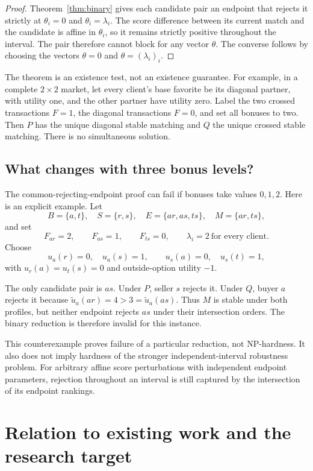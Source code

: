 \documentclass[11pt,letterpaper]{article}
\theoremstyle{definition}
\theoremstyle{remark}
\begin{document}
\begin{proof}
Theorem~\ref{thm:binary} gives each candidate pair an endpoint that rejects it
strictly at \(\theta_i=0\) and \(\theta_i=\lambda_i\).
The score difference between its current match and the candidate is affine
in \(\theta_i\), so it remains strictly positive throughout the interval.
The pair therefore cannot block for any vector \(\theta\).
The converse follows by choosing the vectors \(\theta=0\) and
\(\theta=(\lambda_i)_i\).
\end{proof}

The theorem is an existence test, not an existence guarantee. For example, in
a complete \(2\times2\) market, let every client's base favorite be its diagonal
partner, with utility one, and the other partner have utility zero. Label the
two crossed transactions \(F=1\), the diagonal transactions \(F=0\), and set
all bonuses to two. Then \(P\) has the unique diagonal stable matching and
\(Q\) the unique crossed stable matching. There is no simultaneous solution.

\subsection{What changes with three bonus levels?}

The common-rejecting-endpoint proof can fail if bonuses take values
\(0,1,2\). Here is an explicit example. Let
\[
B=\{a,t\},\quad S=\{r,s\},\quad
E=\{ar,as,ts\},\quad M=\{ar,ts\},
\]
and set
\[
F_{ar}=2,\qquad F_{as}=1,\qquad F_{ts}=0,\qquad
\lambda_i=2\ \text{for every client}.
\]
Choose
\[
u_a(r)=0,\quad u_a(s)=1,\qquad
u_s(a)=0,\quad u_s(t)=1,
\]
with \(u_r(a)=u_t(s)=0\) and outside-option utility \(-1\).

The only candidate pair is \(as\). Under \(P\), seller \(s\) rejects it.
Under \(Q\), buyer \(a\) rejects it because
\(\widetilde u_a(ar)=4>3=\widetilde u_a(as)\).
Thus \(M\) is stable under both profiles, but neither endpoint rejects \(as\)
under their intersection orders. The binary reduction is therefore invalid
for this instance.

This counterexample proves failure of a particular reduction, not NP-hardness.
It also does not imply hardness of the stronger independent-interval
robustness problem. For arbitrary affine score perturbations with independent
endpoint parameters, rejection throughout an interval is still captured by
the intersection of its endpoint rankings.

\section{Relation to existing work and the research target}
\end{document}
